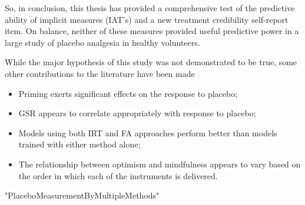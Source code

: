So, in conclusion, this thesis has provided a comprehensive test of
the predictive ability of implicit measures (IAT's) and a new
treatment credibility self-report item. On balance, neither of these
measures provided useful predictive power in a large study of placebo
analgesia in healthy volunteers.

While the major hypothesis of this study was not demonstrated to be
true, some other contributions to the literature have been made
\begin{itemize}
\item Priming exerts significant effects on the response to placebo;
\item GSR appears to correlate appropriately with response to placebo;
\item Models using both IRT and FA approaches perform better than
models trained with either method alone;
\item The relationship between optimism and mindfulness appears to
vary based on the order in which each of the instruments is delivered.
\end{itemize}

"PlaceboMeasurementByMultipleMethods" %